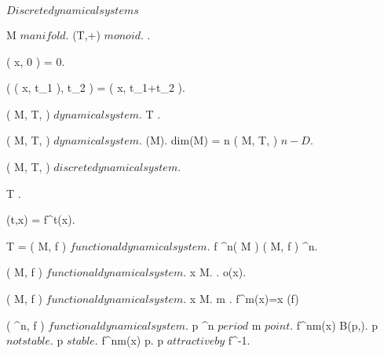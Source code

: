 \documentclass[../Main/main]{subfiles}
\begin{document}
\unit{ $ Discrete dynamical systems $ }
{	
	
	{
		{
			M $ manifold $.
			(T,+) $ monoid $.
			.
		}
		{
			{
				\phi( x, 0 ) = 0.

				{
					\phi( \phi( x, t_1 ), t_2 ) = \phi( x, t_1+t_2 ).
				}
			}
		}
	}


	{
		{
			( M, T, \phi ) $ dynamical system $.
		}
		{
			T \countable.
		}
	}


	{
		{
			( M, T, \phi ) $ dynamical system $.
		}
		{
			\dim(M).
		}
		\denote
		{
			dim(M) = n \as ( M, T, \phi ) $ n-D $.
		}
	}


	{
		{
			( M, T, \phi ) $ discrete dynamical system $.
		}
		{
			T \subset \N.

			{
				{
					\phi(t,x) = f^t(x).
				}
			}
		}
		\denote
		{
			T = \N \as ( M, f ) $ functional dynamical system $.
			f \in \Cc^n( M ) \as ( M, f ) \s \Cc^n.
		}
	}
	
	
	{
		{
			( M, f ) $ functional dynamical system $.
			x \in M.
		}
		{
			.
		}
		\denote
		{
			o(x).
		}
	}
	
	
	{
		{
			( M, f ) $ functional dynamical system $.
			x \in M.
			m \in \N.
		}
		{
			f^m(x)=x
		}
		\denote
		{
			 \as \fixed(f)
		}
	}


	{
		{
			( \R^n, f ) $ functional dynamical system $.
			p \in \R^n $ period $ m $ point $.
		}
		{
			\all{ \epsilon \in \R^+ }
			{
				\ex{ \delta \in \R^+ }
				{
					{
						{
							f^{nm}(x) \in B(p,\epsilon).
						}
					}
				}
			}
		}
		{
			p $ not stable $.
		}
		{
			p $ stable $.
			\ex{ \epsilon \in \R^+ }
			{
				{
					f^{nm}(x) \convergesto p.
				}
			}
		}
		{
			p $ attractive by $ f^{-1}.
		}
	}
	
}
\end{document}
